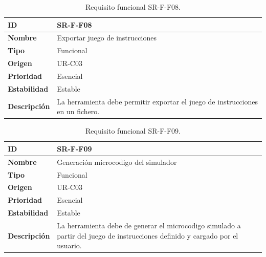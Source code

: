 \begin{center}
\begin{table}[htbp]
\centering
\caption{Requisito funcional SR-F-F08.}
\begin{tabular}{@{}p{2.5cm} p{9cm}@{}} 
\toprule
\textbf{ID} 				& SR-F-F08 \\
\midrule
\textbf{Nombre} 			& Exportar juego de instrucciones\\
\midrule
\textbf{Tipo} 			& Funcional \\
\midrule
\textbf{Origen} 			& UR-C03 \\
\midrule
\textbf{Prioridad}		& Esencial \\
\midrule
\textbf{Estabilidad} 		& Estable \\
\midrule
\textbf{Descripción} 	& La herramienta debe permitir exportar el juego de instrucciones en un fichero. \\
\bottomrule
\end{tabular}
\label{tab:srff08}
\end{table}
\end{center}

\begin{center}
\begin{table}[htbp]
\centering
\caption{Requisito funcional SR-F-F09.}
\begin{tabular}{@{}p{2.5cm} p{9cm}@{}} 
\toprule
\textbf{ID} 				& SR-F-F09 \\
\midrule
\textbf{Nombre} 			& Generación \gls{microcodigo} del simulador\\
\midrule
\textbf{Tipo} 			& Funcional \\
\midrule
\textbf{Origen} 			& UR-C03 \\
\midrule
\textbf{Prioridad}		& Esencial \\
\midrule
\textbf{Estabilidad} 		& Estable \\
\midrule
\textbf{Descripción} 	& La herramienta debe de generar el \gls{microcodigo} simulado a partir del juego de instrucciones definido y cargado por el usuario. \\
\bottomrule
\end{tabular}
\label{tab:srff09}
\end{table}
\end{center}

